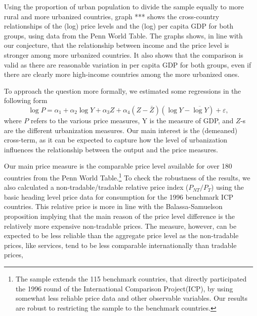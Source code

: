 \documentclass[12pt]{article}
\begin{document}
Using the proportion of urban population to divide the sample
equally to more rural and more urbanized countries, graph
*** shows the cross-country relationships of the (log) price levels
and the (log) per capita GDP for both groups, using data from the
Penn World Table. The graphs shows, in line with our conjecture,
that the relationship between income and the price level is stronger
among more urbanized countries. It also shows that the comparison is
valid as there are reasonable variation in per capita GDP for both
groups, even if there are clearly more high-income countries among
the more urbanized ones.

To approach the question more formally, we estimated some
regressions in the following form
\begin{equation}
\log{P}=\alpha_1+\alpha_2\log Y+\alpha_3Z+\alpha_4(Z-\bar{Z})(\log Y-\overline{\log Y})+\varepsilon,
\end{equation}
where $P$ refers to the various price measures, Y is the measure of
GDP, and $Z$-s are the different urbanization measures. Our main
interest is the (demeaned) cross-term, as it can be expected to
capture how the level of urbanization influences the relationship
between the output and the price measures.

Our main price measure is the comparable price level available for
over 180 countries from the Penn World Table.\footnote{The sample
extends the 115 benchmark countries, that directly participated the
1996 round of the International Comparison Project(ICP), by using
somewhat less reliable price data and other observable variables.
Our results are robust to restricting the sample to the benchmark
countries.} To check the robustness of the results, we also
calculated a non-tradable/tradable relative price index
($P_{NT}/P_{T}$) using the basic heading level price data for
consumption for the 1996 benchmark ICP countries. This relative
price is more in line with the Balassa-Samuelson proposition
implying that the main reason of the price level difference is the
relatively more expensive non-tradable prices. The measure, however,
can be expected to be less reliable than the aggregate price level
as the non-tradable prices, like services, tend to be less
comparable internationally than tradable prices,
\end{document}
